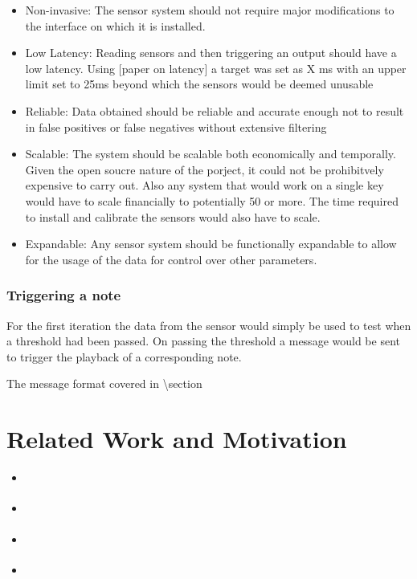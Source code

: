 \begin{itemize}
\item
  Non-invasive: The sensor system should not require major modifications
  to the interface on which it is installed.
\item
  Low Latency: Reading sensors and then triggering an output should have
  a low latency. Using {[}paper on latency{]} a target was set as X ms
  with an upper limit set to 25ms beyond which the sensors would be
  deemed unusable
\item
  Reliable: Data obtained should be reliable and accurate enough not to
  result in false positives or false negatives without extensive
  filtering
\item
  Scalable: The system should be scalable both economically and
  temporally. Given the open soucre nature of the porject, it could not
  be prohibitvely expensive to carry out. Also any system that would
  work on a single key would have to scale financially to potentially 50
  or more. The time required to install and calibrate the sensors would
  also have to scale.
\item
  Expandable: Any sensor system should be functionally expandable to
  allow for the usage of the data for control over other parameters.
\end{itemize}

\subsubsection{Triggering a note}\label{triggering-a-note}

For the first iteration the data from the sensor would simply be used to
test when a threshold had been passed. On passing the threshold a
message would be sent to trigger the playback of a corresponding note.

The message format covered in \textbackslash section

\section{Related Work and Motivation}\label{related-work-and-motivation}

\begin{itemize}
\item
  \cite{Timmermans2020}
\item
  \cite{McPherson2013} \cite{McPherson2019}
\item
  \cite{Mudd2013}
\item
  \cite{Fritz2017}
\end{itemize}

